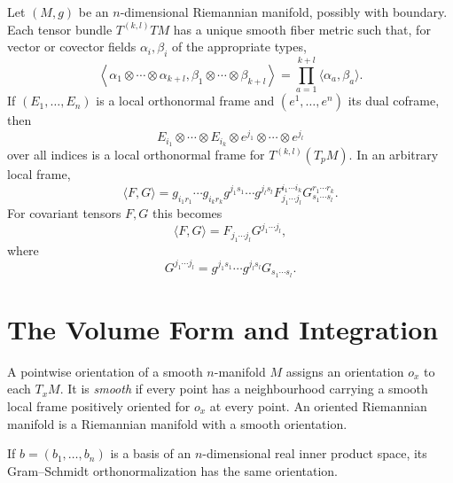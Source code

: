 \begin{proposition}
\label{prop:inner-products-of-tensors}
Let $(M,g)$ be an $n$-dimensional Riemannian manifold, possibly with boundary.
Each tensor bundle $T^{(k,l)}TM$ has a unique smooth fiber metric such that, for
vector or covector fields $\alpha_i,\beta_i$ of the appropriate types,
\begin{equation}
\left\langle\alpha_1\otimes\cdots\otimes\alpha_{k+l},
\beta_1\otimes\cdots\otimes\beta_{k+l}\right\rangle
=\prod_{a=1}^{k+l}\langle\alpha_a,\beta_a\rangle. \tag{2.15}
\end{equation}
If $(E_1,\ldots,E_n)$ is a local orthonormal frame and
$(e^1,\ldots,e^n)$ its dual coframe, then
\[
E_{i_1}\otimes\cdots\otimes E_{i_k}\otimes
e^{j_1}\otimes\cdots\otimes e^{j_l}
\]
over all indices is a local orthonormal frame for $T^{(k,l)}(T_pM)$. In an
arbitrary local frame,
\begin{equation}
\langle F,G\rangle
=g_{i_1r_1}\cdots g_{i_kr_k}g^{j_1s_1}\cdots g^{j_ls_l}
F_{j_1\cdots j_l}^{i_1\cdots i_k}
G_{s_1\cdots s_l}^{r_1\cdots r_k}. \tag{2.16}
\end{equation}
For covariant tensors $F,G$ this becomes
\[
\langle F,G\rangle=F_{j_1\cdots j_l}G^{j_1\cdots j_l},
\]
where
\[
G^{j_1\cdots j_l}
=g^{j_1s_1}\cdots g^{j_ls_l}G_{s_1\cdots s_l}.
\]
\end{proposition}
\section{The Volume Form and Integration}

\begin{definition}
\label{def:smooth-orientation}
\leanok
A pointwise orientation of a smooth $n$-manifold $M$ assigns an orientation $o_x$ to each $T_xM$. It is \emph{smooth} if every point has a neighbourhood carrying a smooth local frame positively oriented for $o_x$ at every point. An oriented Riemannian manifold is a Riemannian manifold with a smooth orientation.
\end{definition}

\begin{lemma}
\label{lem:gram-schmidt-preserves-orientation}
\leanok
If $b=(b_1,\ldots,b_n)$ is a basis of an $n$-dimensional real inner product space, its Gram--Schmidt orthonormalization has the same orientation.
\end{lemma}

